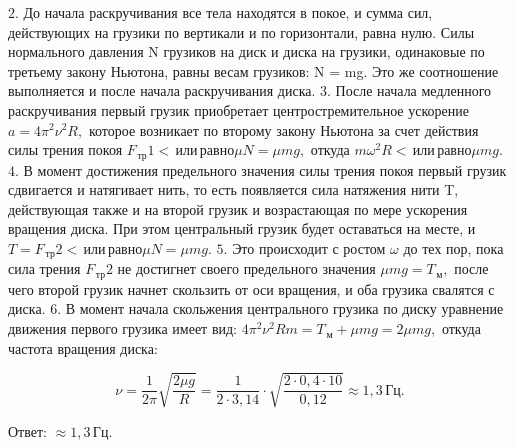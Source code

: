 \documentclass[12pt,a4paper]{article}
\begin{document}
{$2$.  До начала раскручивания все тела находятся в покое, и сумма сил, действующих на грузики по вертикали и по горизонтали, равна нулю. Силы нормального давления N грузиков на диск и диска на грузики, одинаковые по третьему закону Ньютона, равны весам грузиков: N  =  mg. Это же соотношение выполняется и после начала раскручивания диска. 
$3$.  После начала медленного раскручивания первый грузик приобретает центростремительное ускорение $a=4 \pi ^2 \nu ^2 R,$ которое возникает по второму закону Ньютона за счет действия силы трения покоя $F_{\,\text{тр}}1 < \,\text{или} \,\text{равно} \mu N=\mu mg,$ откуда $m\omega ^2 R < \,\text{или} \,\text{равно} \mu mg.$
$4$.  В момент достижения предельного значения силы трения покоя первый грузик сдвигается и натягивает нить, то есть появляется сила натяжения нити T, действующая также и на второй грузик и возрастающая по мере ускорения вращения диска. При этом центральный грузик будет оставаться на месте, и $T=F_{\,\text{тр}}2 < \,\text{или} \,\text{равно} \mu N=\mu mg.$
$5$.  Это происходит с ростом $\omega$ до тех пор, пока сила трения $F_{\,\text{тр}}2$ не достигнет своего предельного значения $\mu mg=T_{\,\text{м}},$ после чего второй грузик начнет скользить от оси вращения, и оба грузика свалятся с диска.
$6$.  В момент начала скольжения центрального грузика по диску уравнение движения первого грузика имеет вид: $4 \pi ^2 \nu ^2 Rm=T_{\,\text{м}} + \mu mg=2\mu mg,$ откуда частота вращения диска:

\[\nu = \frac{1}{2 \pi} \sqrt{\frac{2\mu g}{R}} = \frac{1}{2 \cdot 3{,}14} \cdot \sqrt{\frac{2 \cdot 0{,}4 \cdot 10}{0{,}12}} \approx 1{,}3\,\text{Гц}.\]

Ответ: $\approx 1{,}3\,\text{Гц}.$
}
\end{document}
